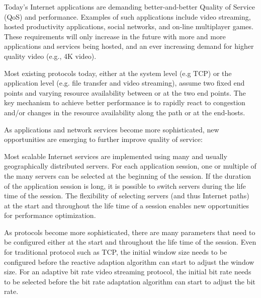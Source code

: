 


Today's Internet applications are demanding better-and-better Quality of Service (QoS) and performance. Examples of such applications include video streaming, hosted productivity applications, social networks, and on-line multiplayer games. These requirements will only increase in the future with more and more applications and services being hosted, and an ever increasing demand for higher quality video (e.g., 4K video).

Most existing protocols today, either at the system level (e.g TCP) or the application level (e.g. file transfer and video streaming), assume two fixed end points and varying resource availability between or at the two end points.  The key mechanism to achieve better performance is to rapidly react to congestion and/or changes in the resource availability along the path or at the end-hosts. 

As applications and network services become more sophisticated,  new opportunities are emerging to further improve quality of service: 

  Most scalable Internet services are implemented using many and usually geographically distributed servers.  For each application session, one or multiple of the many servers can be selected at the beginning of the session.  If the duration of the application session is long, it is possible to switch servers during the life time of the session. 
The flexibility of selecting servers (and thus Internet paths) at the start and throughout the life time of a session enables new opportunities for performance optimization. 

 As protocols become more sophisticated, there are many parameters that need to be configured either at the start and throughout the life time of the session. Even for traditional protocol such as TCP, the initial window size needs to be configured before the reactive adaption algorithm can start to adjust the window size. For an adaptive bit rate video streaming protocol, the initial bit rate needs to be selected before the bit rate adaptation algorithm can start to adjust the bit rate. 

